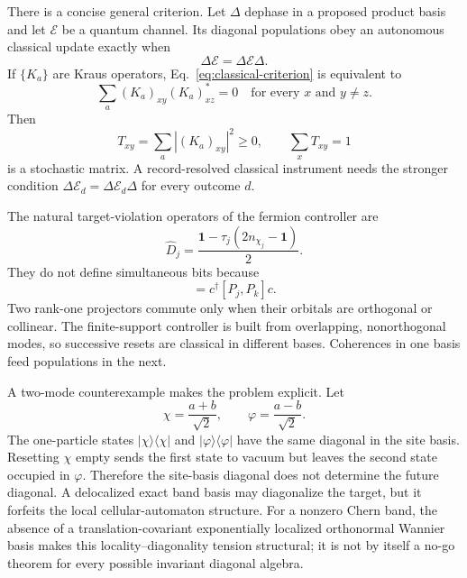 \documentclass[
  aps,prx,twocolumn,superscriptaddress,longbibliography,
  nofootinbib,floatfix
]{revtex4-2}
\newcommand{\Id}{\mathbf{1}}
\newcommand{\cE}{\mathcal{E}}
\newcommand{\proj}[1]{\lvert #1\rangle\!\langle #1\rvert}
\theoremstyle{plain}
\theoremstyle{definition}
\begin{document}
There is a concise general criterion.  Let \(\Delta\) dephase in a proposed
product basis and let \(\cE\) be a quantum channel.  Its diagonal populations
obey an autonomous classical update exactly when
\begin{equation}
 \boxed{\Delta\cE=\Delta\cE\Delta.}
 \label{eq:classical-criterion}
\end{equation}
If \(\{K_a\}\) are Kraus operators, Eq.~\eqref{eq:classical-criterion} is
equivalent to
\begin{equation}
 \sum_a(K_a)_{xy}(K_a)_{xz}^*=0
 \quad\text{for every }x\text{ and }y\neq z.
 \label{eq:coherence-feed-criterion}
\end{equation}
Then
\begin{equation}
 T_{xy}=\sum_a|(K_a)_{xy}|^2\geq0,
 \qquad \sum_xT_{xy}=1
 \label{eq:classical-transition-matrix}
\end{equation}
is a stochastic matrix.  A record-resolved classical instrument needs the
stronger condition \(\Delta\cE_d=\Delta\cE_d\Delta\) for every outcome \(d\).

The natural target-violation operators of the fermion controller are
\begin{equation}
 \widehat D_j
 =\frac{\Id-\tau_j(2n_{\chi_j}-\Id)}{2}.
 \label{eq:violation-operators}
\end{equation}
They do not define simultaneous bits because
\begin{equation}
 [n_{\chi_j},n_{\chi_k}]
 =c^\dagger[P_j,P_k]c.
 \label{eq:number-commutator}
\end{equation}
Two rank-one projectors commute only when their orbitals are orthogonal or
collinear.  The finite-support controller is built from overlapping,
nonorthogonal modes, so successive resets are classical in different bases.
Coherences in one basis feed populations in the next.

A two-mode counterexample makes the problem explicit.  Let
\begin{equation}
 \chi=\frac{a+b}{\sqrt2},
 \qquad
 \varphi=\frac{a-b}{\sqrt2}.
 \label{eq:two-mode-counterexample}
\end{equation}
The one-particle states \(\proj{\chi}\) and \(\proj{\varphi}\) have the same
diagonal in the site basis.  Resetting \(\chi\) empty sends the first state to
vacuum but leaves the second state occupied in \(\varphi\).  Therefore the
site-basis diagonal does not determine the future diagonal.  A delocalized
exact band basis may diagonalize the target, but it forfeits the local
cellular-automaton structure.  For a nonzero Chern band, the absence of a
translation-covariant exponentially localized orthonormal Wannier basis makes
this locality--diagonality tension structural; it is not by itself a no-go
theorem for every possible invariant diagonal algebra.
\end{document}
